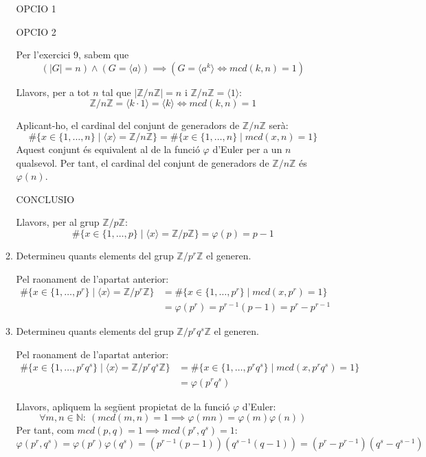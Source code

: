 \documentclass[a4paper, 11pt]{article}
\newcommand{\tq}{:\ }
\begin{document}
\begin{enumerate}
\begin{enumerate}
				OPCIO 1
				
				

				OPCIO 2
				
				 Per l'exercici 9, sabem que 
				\[(|G| = n) \land (G = \langle a \rangle) \implies (G = \langle a^k \rangle \iff mcd(k, n) = 1)\]

				Llavors, per a tot $n$ tal que $|\mathbb{Z} / n \mathbb{Z}| = n$ i $\mathbb{Z} / n \mathbb{Z} = \langle 1 \rangle$:
				\[\mathbb{Z} / n \mathbb{Z} = \langle k \cdot 1 \rangle = \langle k \rangle \iff mcd (k, n) = 1\]

				Aplicant-ho, el cardinal del conjunt de generadors de $\mathbb{Z} / n \mathbb{Z}$ serà:
				\[\#\{x \in \{1, \dotsc , n\} \mid \langle x \rangle = \mathbb{Z} / n \mathbb{Z}\} = \#\{x \in \{1, \dotsc , n\} \mid mcd(x, n) = 1\}\]
				Aquest conjunt és equivalent al de la funció $\varphi$ d'Euler per a un $n$ qualsevol. Per tant, el cardinal del conjunt de generadors de $\mathbb{Z} / n \mathbb{Z}$ és $\varphi (n)$.

				CONCLUSIO

				Llavors, per al grup $\mathbb{Z} / p \mathbb{Z}$:
				\[\#\{x \in \{1, \dotsc , p\} \mid \langle x \rangle = \mathbb{Z} / p \mathbb{Z}\} = \varphi (p) = p-1\]

			\item Determineu quants elements del grup $\mathbb{Z} / p^r \mathbb{Z}$ el generen.\medskip

				Pel raonament de l'apartat anterior:
				\[\begin{aligned}
					\#\{x \in \{1, \dotsc , p^r\} \mid \langle x \rangle = \mathbb{Z} / p^r \mathbb{Z}\} & = \#\{x \in \{1, \dotsc , p^r\} \mid mcd(x, p^r) = 1\} \\
					& = \varphi (p^r) = p^{r-1}(p-1) = p^r-p^{r-1}
				\end{aligned}\]

			\item Determineu quants elements del grup $\mathbb{Z} / p^r q^s \mathbb{Z}$ el generen.
				
				Pel raonament de l'apartat anterior:
				\[\begin{aligned}
					\#\{x \in \{1, \dotsc , p^r q^s\} \mid \langle x \rangle = \mathbb{Z} / p^r q^s \mathbb{Z}\} & = \#\{x \in \{1, \dotsc , p^r q^s\} \mid mcd(x, p^r q^s) = 1\} \\
					& = \varphi (p^r q^s)
				\end{aligned}\]

				Llavors, apliquem la següent propietat de la funció $\varphi$ d'Euler:
				\[\forall m,n \in \mathbb{N} \tq (mcd(m,n) = 1 \implies \varphi (mn) = \varphi (m) \varphi (n))\]
				Per tant, com $mcd(p, q) = 1 \implies mcd(p^r,q^s) = 1$:
				\[\varphi (p^r, q^s) = \varphi (p^r) \varphi (q^s) = (p^{r-1} (p-1)) (q^{s-1}(q-1)) = (p^{r}-p^{r-1}) (q^s-q^{s-1}) \]
		\end{enumerate}
	

\end{enumerate}
\end{document}
